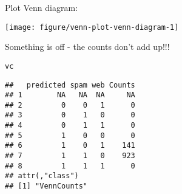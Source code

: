 \documentclass{article}\usepackage[]{graphicx}\usepackage[]{color}
\makeatletter
\newcommand{\hlstd}[1]{\textcolor[rgb]{0.345,0.345,0.345}{#1}}%
\newenvironment{kframe}{%
 \def\at@end@of@kframe{}%
 \ifinner\ifhmode%
  \def\at@end@of@kframe{\end{minipage}}%
  \begin{minipage}{\columnwidth}%
 \fi\fi%
 \def\FrameCommand##1{\hskip\@totalleftmargin \hskip-\fboxsep
 \colorbox{shadecolor}{##1}\hskip-\fboxsep
     \hskip-\linewidth \hskip-\@totalleftmargin \hskip\columnwidth}%
 \MakeFramed {\advance\hsize-\width
   \@totalleftmargin\z@ \linewidth\hsize
   \@setminipage}}%
 {\par\unskip\endMakeFramed%
 \at@end@of@kframe}
\newenvironment{knitrout}{}{} %
\makeatother
\begin{document}
Plot Venn diagram:
\begin{knitrout}
\color{fgcolor}

{\centering \texttt{[image: figure/venn-plot-venn-diagram-1]} 

}



\end{knitrout}

Something is off - the counts don't add up!!!
\begin{knitrout}
\color{fgcolor}\begin{kframe}
\begin{alltt}
\hlstd{vc}
\end{alltt}
\begin{verbatim}
##   predicted spam web Counts
## 1        NA   NA  NA     NA
## 2         0    0   1      0
## 3         0    1   0      0
## 4         0    1   1      0
## 5         1    0   0      0
## 6         1    0   1    141
## 7         1    1   0    923
## 8         1    1   1      0
## attr(,"class")
## [1] "VennCounts"
\end{verbatim}
\end{kframe}
\end{knitrout}
\end{document}
